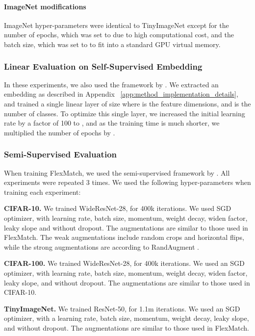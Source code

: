 \documentclass{article}
\newcommand{\myparagraph}[1]{\smallskip\noindent\textbf{#1}}
\begin{document}
\paragraph{ImageNet modifications}
ImageNet hyper-parameters were identical to TinyImageNet except for the number of epochs, which was set to  due to high computational cost, and the batch size, which was set to  to fit into a standard GPU virtual memory.


\subsubsection{Linear Evaluation on Self-Supervised Embedding}
\label{app:linear_eval_implementation}
In these experiments, we also used the framework by \citet{Munjal2020TowardsRA}.
We extracted an embedding as described in Appendix ~\ref{app:method_implementation_details}, and trained a single linear layer of size  where  is the feature dimensions, and  is the number of classes. To optimize this single layer, we increased the initial learning rate by a factor of 100 to , and as the training time is much shorter, we multiplied the number of epochs by .


\subsubsection{Semi-Supervised Evaluation}
\label{app:semi_implementation}
When training FlexMatch, we used the semi-supervised framework by \citet{DBLP:journals/corr/abs-2110-08263}. All experiments were repeated 3 times.
We used the following hyper-parameters when training each experiment:

\myparagraph{CIFAR-10.} We trained WideResNet-28, for 400k iterations. We used SGD optimizer, with  learning rate,  batch size,  momentum,  weight decay,  widen factor,  leaky slope and without dropout. 
The augmentations are similar to those used in FlexMatch. The weak augmentations include random crops and horizontal flips, while the strong augmentations are according to RandAugment \citep{cubuk2020randaugment}.

\myparagraph{CIFAR-100.} We trained WideResNet-28, for 400k iterations. We used an SGD optimizer, with  learning rate,  batch size,  momentum,  weight decay,  widen factor,  leaky slope, and without dropout. The augmentations are similar to those used in CIFAR-10.

\myparagraph{TinyImageNet.} We trained ResNet-50, for 1.1m iterations. We used an SGD optimizer, with a  learning rate,  batch size,  momentum,  weight decay,  leaky slope, and without dropout. The augmentations are similar to those used in FlexMatch.
\end{document}
